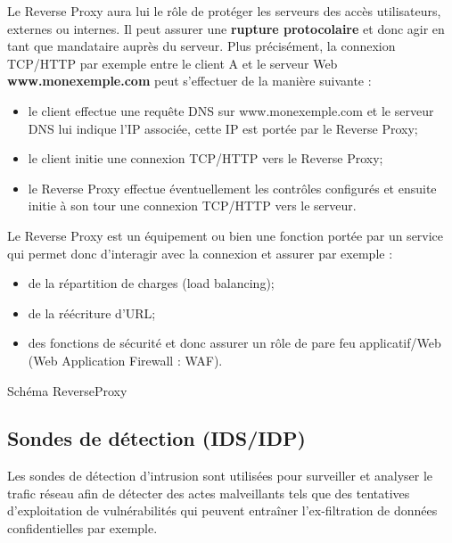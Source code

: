 Le Reverse Proxy aura lui le rôle de protéger les serveurs des accès utilisateurs, externes ou internes.
Il peut assurer une \textbf{rupture protocolaire} et donc agir en tant que mandataire auprès du serveur.
Plus précisément, la connexion TCP/HTTP par exemple entre le client A et le serveur Web \textbf{www.monexemple.com} peut s'effectuer de la manière suivante : 
\begin{itemize}
    \item le client effectue une requête DNS sur www.monexemple.com et le serveur DNS lui indique l'IP associée, cette IP est portée par le Reverse Proxy;
    \item le client initie une connexion TCP/HTTP vers le Reverse Proxy;
    \item le Reverse Proxy effectue éventuellement les contrôles configurés et ensuite initie à son tour une connexion TCP/HTTP vers le serveur.
\end{itemize}
Le Reverse Proxy est un équipement ou bien une fonction portée par un service qui permet donc d'interagir avec la connexion et assurer par exemple :
\begin{itemize}
    \item de la répartition de charges (load balancing);
    \item de la réécriture d'URL;
    \item des fonctions de sécurité et donc assurer un rôle de pare feu applicatif/Web (Web Application Firewall : WAF).
\end{itemize}
Schéma ReverseProxy


\subsection{Sondes de détection (IDS/IDP)}

Les sondes de détection d'intrusion sont utilisées pour surveiller et analyser le trafic réseau afin de détecter des actes malveillants tels que des tentatives d'exploitation de vulnérabilités qui peuvent entraîner l'ex-filtration de données confidentielles par exemple. 

